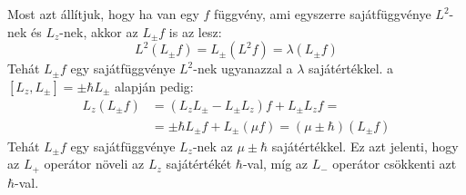 \documentclass[../main.tex]{subfiles}
\begin{document}
Most azt állítjuk, hogy ha van egy $f$ függvény, ami egyszerre sajátfüggvénye $L^2$-nek és $L_z$-nek, akkor az $L_\pm f$ is az lesz:
\begin{equation}
    L^2 (L_\pm f) = L_\pm (L^2 f) = \lambda (L_\pm f)
\end{equation}
Tehát $L_\pm f$ egy sajátfüggvénye $L^2$-nek ugyanazzal a $\lambda$ sajátértékkel. a $[L_z, L_\pm] = \pm \hbar L_\pm$ alapján pedig:
\begin{equation}
    \begin{aligned}
        L_z (L_\pm f) &= (L_z L_\pm - L_\pm L_z) f + L_\pm L_z f = \\
        &= \pm \hbar L_\pm f + L_\pm (\mu f) = (\mu \pm \hbar) (L_\pm f)
    \end{aligned}
\end{equation}
Tehát $L_\pm f$ egy sajátfüggvénye $L_z$-nek az $\mu \pm \hbar$ sajátértékkel. Ez azt jelenti, hogy az $L_+$ operátor növeli az $L_z$ sajátértékét $\hbar$-val, míg az $L_-$ operátor csökkenti azt $\hbar$-val.
\end{document}
